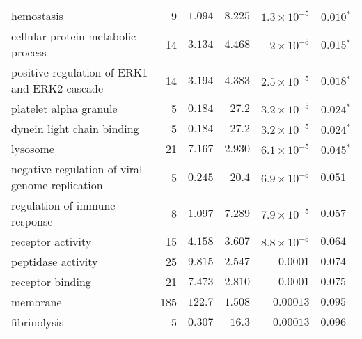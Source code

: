 \begin{longtable}{|l|r|r|r|r|r|}
                                        hemostasis &                       9 &                $ 1.094$ &   $ 8.225$ &  $1.3\times 10^{-5}$ &              $\bm{ 0.010{^*}}$ \\
                cellular protein metabolic process &                      14 &                $ 3.134$ &   $ 4.468$ &   $ 2\times 10^{-5}$ &              $\bm{ 0.015{^*}}$ \\
      positive regulation of ERK1 and ERK2 cascade &                      14 &                $ 3.194$ &   $ 4.383$ &  $2.5\times 10^{-5}$ &              $\bm{ 0.018{^*}}$ \\
                            platelet alpha granule &                       5 &                $ 0.184$ &   $  27.2$ &  $3.2\times 10^{-5}$ &              $\bm{ 0.024{^*}}$ \\
                        dynein light chain binding &                       5 &                $ 0.184$ &   $  27.2$ &  $3.2\times 10^{-5}$ &              $\bm{ 0.024{^*}}$ \\
                                          lysosome &                      21 &                $ 7.167$ &   $ 2.930$ &  $6.1\times 10^{-5}$ &              $\bm{ 0.045{^*}}$ \\
   negative regulation of viral genome replication &                       5 &                $ 0.245$ &   $  20.4$ &  $6.9\times 10^{-5}$ &                     $ 0.051~~$ \\
                     regulation of immune response &                       8 &                $ 1.097$ &   $ 7.289$ &  $7.9\times 10^{-5}$ &                     $ 0.057~~$ \\
                                 receptor activity &                      15 &                $ 4.158$ &   $ 3.607$ &  $8.8\times 10^{-5}$ &                     $ 0.064~~$ \\
                                peptidase activity &                      25 &                $ 9.815$ &   $ 2.547$ &             $0.0001$ &                     $ 0.074~~$ \\
                                  receptor binding &                      21 &                $ 7.473$ &   $ 2.810$ &             $0.0001$ &                     $ 0.075~~$ \\
                                          membrane &                     185 &                $ 122.7$ &   $ 1.508$ &            $0.00013$ &                     $ 0.095~~$ \\
                                      fibrinolysis &                       5 &                $ 0.307$ &   $  16.3$ &            $0.00013$ &                     $ 0.096~~$ \\

\end{longtable}

